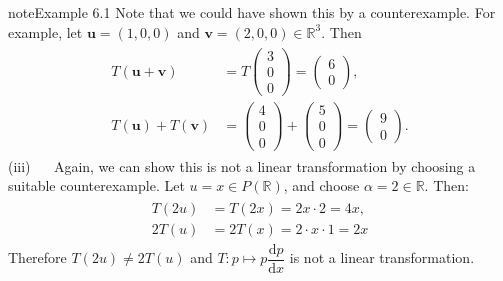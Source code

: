 \documentclass[letterpaper,10pt,english]{jupyterBook}
\begin{document}
\begin{sphinxadmonition}{note}{Example 6.1}
\sphinxAtStartPar
Note that we could have shown this by a counterexample. For example, let \(\mathbf{u} = ( 1, 0 , 0 )\) and \(\mathbf{v} = (2, 0, 0) \in \mathbb{R}^3\). Then
\begin{equation*}
\begin{split} \begin{align*}
    T(\mathbf{u} + \mathbf{v}) &= T
    \begin{pmatrix} 3 \\ 0 \\ 0 \end{pmatrix}
    = \begin{pmatrix} 6 \\ 0 \end{pmatrix}, \\
    T(\mathbf{u}) + T(\mathbf{v}) &=
    \begin{pmatrix} 4 \\ 0 \\ 0 \end{pmatrix} + \begin{pmatrix} 5 \\ 0 \\ 0 \end{pmatrix}
    = \begin{pmatrix} 9 \\ 0 \end{pmatrix}.
\end{align*} \end{split}
\end{equation*}
\sphinxAtStartPar
(iii)   Again, we can show this is not a linear transformation by choosing a suitable counterexample. Let \(u = x \in P(\mathbb{R})\), and choose \(\alpha = 2 \in \mathbb{R}\). Then:
\begin{equation*}
\begin{split} \begin{align*}
    T(2u) &= T(2x) = 2x \cdot 2 = 4x, \\
    2T(u) &= 2T(x) = 2 \cdot x \cdot 1 = 2x
\end{align*}  \end{split}
\end{equation*}
\sphinxAtStartPar
Therefore \(T(2u) \neq 2T(u)\) and \(T: p \mapsto p \dfrac{\mathrm{d}p}{\mathrm{d}x}\) is not a linear transformation.
\end{sphinxadmonition}

\ignorespaces {}\label{\detokenize{_pages/6.0_Linear_transformations:transformation-matrix-section}}
\sphinxstepscope
\end{document}
